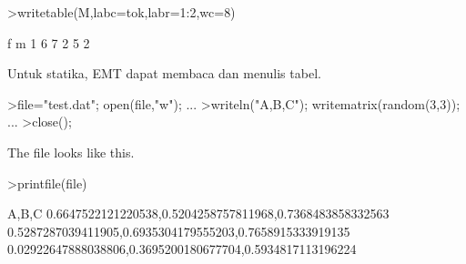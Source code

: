 \documentclass{article}
\begin{document}
\begin{eulernotebook}
\begin{eulercomment}
\begin{eulercomment}
\begin{eulercomment}
\begin{eulercomment}
\begin{eulercomment}
\begin{eulercomment}
\begin{eulercomment}
\begin{eulercomment}
\begin{eulercomment}
\begin{eulercomment}
\begin{eulercomment}
\begin{eulercomment}
\begin{eulercomment}
\begin{eulercomment}
\begin{eulerprompt}
>writetable(M,labc=tok,labr=1:2,wc=8)
\end{eulerprompt}
\begin{euleroutput}
                 f       m
         1       6       7
         2       5       2
\end{euleroutput}
\begin{eulercomment}
Untuk statika, EMT dapat membaca dan menulis tabel.
\end{eulercomment}
\begin{eulerprompt}
>file="test.dat"; open(file,"w"); ...
>writeln("A,B,C"); writematrix(random(3,3)); ...
>close();
\end{eulerprompt}
\begin{eulercomment}
The file looks like this.
\end{eulercomment}
\begin{eulerprompt}
>printfile(file)
\end{eulerprompt}
\begin{euleroutput}
  A,B,C
  0.6647522121220538,0.5204258757811968,0.7368483858332563
  0.5287287039411905,0.6935304179555203,0.7658915333919135
  0.02922647888038806,0.3695200180677704,0.5934817113196224
  

\end{euleroutput}
\end{eulercomment}
\end{eulercomment}
\end{eulercomment}
\end{eulercomment}
\end{eulercomment}
\end{eulercomment}
\end{eulercomment}
\end{eulercomment}
\end{eulercomment}
\end{eulercomment}
\end{eulercomment}
\end{eulercomment}
\end{eulercomment}
\end{eulercomment}
\end{eulernotebook}
\end{document}

